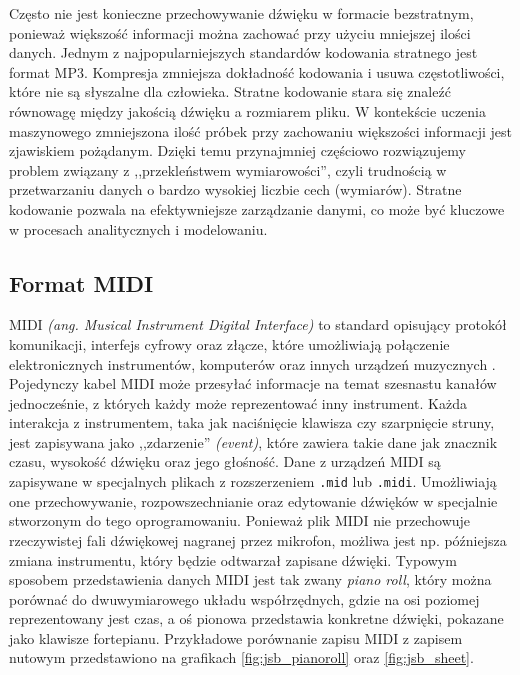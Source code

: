 \documentclass[data-science]{agh-wi} %
\begin{document}
Często nie jest konieczne przechowywanie dźwięku w formacie bezstratnym, ponieważ większość informacji można zachować przy użyciu mniejszej ilości danych. Jednym z najpopularniejszych standardów kodowania stratnego jest format MP3. Kompresja zmniejsza dokładność kodowania i usuwa częstotliwości, które nie są słyszalne dla człowieka. Stratne kodowanie stara się znaleźć równowagę między jakością dźwięku a rozmiarem pliku. W kontekście uczenia maszynowego zmniejszona ilość próbek przy zachowaniu większości informacji jest zjawiskiem pożądanym. Dzięki temu przynajmniej częściowo rozwiązujemy problem związany z ,,przekleństwem wymiarowości'', czyli trudnością w przetwarzaniu danych o bardzo wysokiej liczbie cech (wymiarów). Stratne kodowanie pozwala na efektywniejsze zarządzanie danymi, co może być kluczowe w procesach analitycznych i modelowaniu.

\subsection{Format MIDI}
MIDI \textit{(ang. Musical Instrument Digital Interface)} to standard opisujący protokół komunikacji, interfejs cyfrowy oraz złącze, które umożliwiają połączenie elektronicznych instrumentów, komputerów oraz innych urządzeń muzycznych \cite{midi_specification}. Pojedynczy kabel MIDI może przesyłać informacje na temat szesnastu kanałów jednocześnie, z których każdy może reprezentować inny instrument. Każda interakcja z instrumentem, taka jak naciśnięcie klawisza czy szarpnięcie struny, jest zapisywana jako ,,zdarzenie'' \textit{(event)}, które zawiera takie dane jak znacznik czasu, wysokość dźwięku oraz jego głośność. Dane z urządzeń MIDI są zapisywane w specjalnych plikach z rozszerzeniem \texttt{.mid} lub \texttt{.midi}. Umożliwiają one przechowywanie, rozpowszechnianie oraz edytowanie dźwięków w specjalnie stworzonym do tego oprogramowaniu. Ponieważ plik MIDI nie przechowuje rzeczywistej fali dźwiękowej nagranej przez mikrofon, możliwa jest np. późniejsza zmiana instrumentu, który będzie odtwarzał zapisane dźwięki. Typowym sposobem przedstawienia danych MIDI jest tak zwany \textit{piano roll}, który można porównać do dwuwymiarowego układu współrzędnych, gdzie na osi poziomej reprezentowany jest czas, a oś pionowa przedstawia konkretne dźwięki, pokazane jako klawisze fortepianu. Przykładowe porównanie zapisu MIDI z zapisem nutowym przedstawiono na grafikach \ref*{fig:jsb_pianoroll} oraz \ref*{fig:jsb_sheet}.
\end{document}
